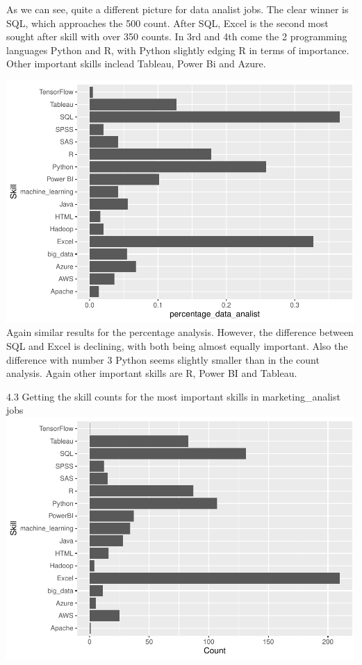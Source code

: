 \documentclass[
]{article}
\begin{document}
As we can see, quite a different picture for data analist jobs. The
clear winner is SQL, which approaches the 500 count. After SQL, Excel is
the second most sought after skill with over 350 counts. In 3rd and 4th
come the 2 programming languages Python and R, with Python slightly
edging R in terms of importance. Other important skills inclead Tableau,
Power Bi and Azure.

\includegraphics{analysis_files/figure-latex/unnamed-chunk-17-1.pdf}
Again similar results for the percentage analysis. However, the
difference between SQL and Excel is declining, with both being almost
equally important. Also the difference with number 3 Python seems
slightly smaller than in the count analysis. Again other important
skills are R, Power BI and Tableau.

4.3 Getting the skill counts for the most important skills in
marketing\_analist jobs
\includegraphics{analysis_files/figure-latex/unnamed-chunk-19-1.pdf}
\end{document}
